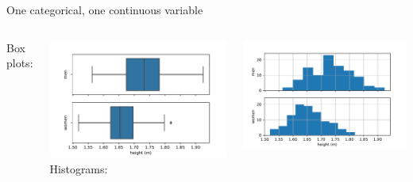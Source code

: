 \documentclass[aspectratio=169,usenames,dvipsnames]{beamer}
\begin{document}
\begin{frame}{One categorical, one continuous variable}
    \begin{columns}
            Box plots:

            \includegraphics[width=\linewidth]{fig/contcontheightbox}
            Histograms:

            \includegraphics[width=\linewidth]{fig/contcontheighthist}
    \end{columns}
\end{frame}
\end{document}
